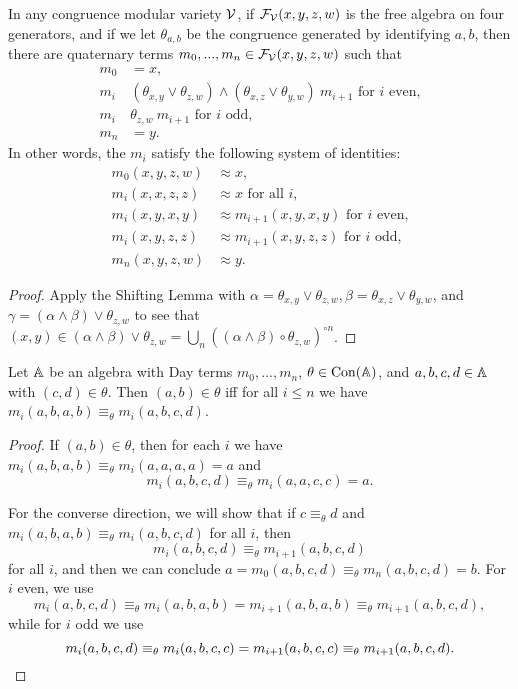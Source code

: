 \begin{appendices}
\begin{cor}\label{day-terms} In any congruence modular variety $\mathcal{V}$, if $\mathcal{F}_{\mathcal{V}}(x,y,z,w)$ is the free algebra on four generators, and if we let $\theta_{a,b}$ be the congruence generated by identifying $a,b$, then there are quaternary terms $m_0, ..., m_n \in \mathcal{F}_{\mathcal{V}}(x,y,z,w)$ such that
\begin{align*}
m_0 &= x,\\
m_i\ &(\theta_{x,y}\vee \theta_{z,w})\wedge (\theta_{x,z}\vee \theta_{y,w})\ m_{i+1}\text{ for $i$ even,}\\
m_i\ &\theta_{z,w}\ m_{i+1}\text{ for $i$ odd,}\\
m_n &= y.
\end{align*}
In other words, the $m_i$ satisfy the following system of identities:
\begin{align*}
m_0(x,y,z,w) &\approx x,\\
m_i(x,x,z,z) &\approx x\text{ for all $i$,}\\
m_i(x,y,x,y) &\approx m_{i+1}(x,y,x,y)\text{ for $i$ even,}\\
m_i(x,y,z,z) &\approx m_{i+1}(x,y,z,z)\text{ for $i$ odd,}\\
m_n(x,y,z,w) &\approx y.
\end{align*}
\end{cor}
\begin{proof} Apply the Shifting Lemma with $\alpha = \theta_{x,y}\vee \theta_{z,w}, \beta = \theta_{x,z}\vee \theta_{y,w}$, and $\gamma = (\alpha \wedge \beta)\vee \theta_{z,w}$ to see that $(x,y) \in (\alpha \wedge \beta)\vee \theta_{z,w} = \bigcup_n ((\alpha \wedge \beta)\circ \theta_{z,w})^{\circ n}$.
\end{proof}

\begin{lem}\label{day-congruence} Let $\mathbb{A}$ be an algebra with Day terms $m_0, ..., m_n$, $\theta \in \operatorname{Con}(\mathbb{A})$, and $a,b,c,d \in \mathbb{A}$ with $(c,d) \in \theta$. Then $(a,b) \in \theta$ iff for all $i \le n$ we have $m_i(a,b,a,b) \equiv_\theta m_i(a,b,c,d)$.
\end{lem}
\begin{proof} If $(a,b) \in \theta$, then for each $i$ we have $m_i(a,b,a,b) \equiv_\theta m_i(a,a,a,a) = a$ and
\[
m_i(a,b,c,d) \equiv_\theta m_i(a,a,c,c) = a.
\]

For the converse direction, we will show that if $c \equiv_\theta d$ and $m_i(a,b,a,b) \equiv_\theta m_i(a,b,c,d)$ for all $i$, then
\[
m_i(a,b,c,d) \equiv_\theta m_{i+1}(a,b,c,d)
\]
for all $i$, and then we can conclude $a = m_0(a,b,c,d) \equiv_\theta m_n(a,b,c,d) = b$. For $i$ even, we use
\[
m_i(a,b,c,d) \equiv_\theta m_i(a,b,a,b) = m_{i+1}(a,b,a,b) \equiv_\theta m_{i+1}(a,b,c,d),
\]
while for $i$ odd we use
\[
m_i(a,b,c,d) \equiv_\theta m_i(a,b,c,c) = m_{i+1}(a,b,c,c) \equiv_\theta m_{i+1}(a,b,c,d).\qedhere
\]
\end{proof}


\end{appendices}
